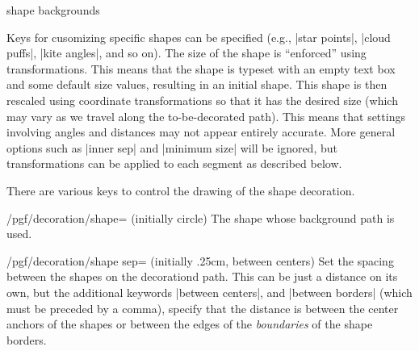\begin{decoration}{shape backgrounds}
\begin{codeexample}[]
\end{codeexample}

  Keys for cusomizing specific shapes can be specified (e.g., 
  |star points|, |cloud puffs|, |kite angles|, and so on). The size of
  the shape is ``enforced'' using transformations. This means that the
  shape is typeset with an empty text box and some default size
  values, resulting in an initial shape. This shape is then rescaled
  using coordinate transformations so that it has the desired size
  (which may vary as we travel along the to-be-decorated path). This
  means that settings involving angles and distances may not appear
  entirely accurate. More general options such as |inner sep| and
  |minimum size| will be ignored,  but transformations can be applied
  to each segment as described below.
  
\begin{codeexample}[]
\end{codeexample}

  There are various keys to control the drawing of the shape
  decoration. 
  
  \begin{key}{/pgf/decoration/shape= (initially circle)}
    The shape whose background path is used.
  \end{key}
  
  \begin{key}{/pgf/decoration/shape sep= (initially {.25cm, between centers})}
    Set the spacing between the shapes on the decorationd path. This can be
    just a distance on its own, but the additional keywords 
    |between centers|, and |between borders| (which must be preceded by a 
    comma), specify that the distance	is between the center anchors of 
    the shapes or between the edges of the \emph{boundaries} of
    the shape borders.
	

\end{key}
\end{decoration}
